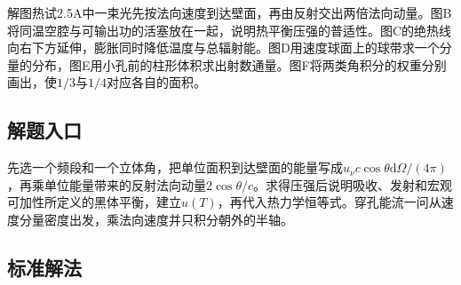 \documentclass[UTF8,fontset=fandol,a4paper,11pt]{ctexart}
\begin{document}
解图热试2.5A中一束光先按法向速度到达壁面，再由反射交出两倍法向动量。图B将同温空腔与可输出功的活塞放在一起，说明热平衡压强的普适性。图C的绝热线向右下方延伸，膨胀同时降低温度与总辐射能。图D用速度球面上的球带求一个分量的分布，图E用小孔前的柱形体积求出射数通量。图F将两类角积分的权重分别画出，使$1/3$与$1/4$对应各自的面积。



\subsection*{解题入口}

先选一个频段和一个立体角，把单位面积到达壁面的能量写成$u_\nu c\cos\theta\mathrm d\Omega/(4\pi)$，再乘单位能量带来的反射法向动量$2\cos\theta/c$。求得压强后说明吸收、发射和宏观可加性所定义的黑体平衡，建立$u(T)$，再代入热力学恒等式。穿孔能流一问从速度分量密度出发，乘法向速度并只积分朝外的半轴。



\subsection*{标准解法}
\end{document}
